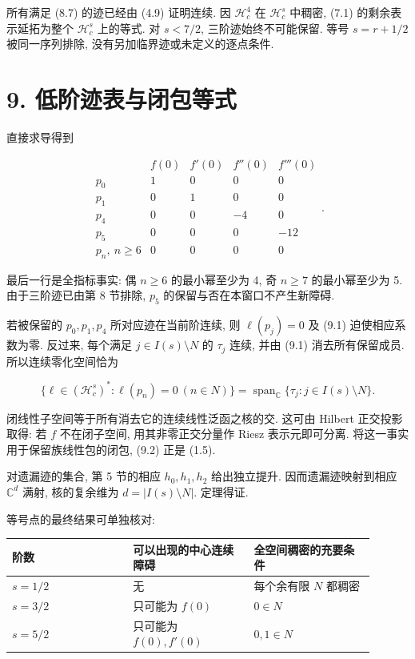 \documentclass[UTF8,fontset=fandol,11pt,a4paper]{ctexart}
\begin{document}
所有满足 (8.7) 的迹已经由 (4.9) 证明连续. 因 \(\mathcal H_c^4\) 在 \(\mathcal H_c^s\) 中稠密, (7.1) 的剩余表示延拓为整个 \(\mathcal H_c^s\) 上的等式. 对 \(s<7/2\), 三阶迹始终不可能保留. 等号 \(s=r+1/2\) 被同一序列排除, 没有另加临界迹或未定义的逐点条件.


\section*{9. 低阶迹表与闭包等式}

直接求导得到


\[
 \begin{array}{c|rrrr}
       &f(0)&f'(0)&f''(0)&f'''(0)\\ \hline
 p_0&1&0&0&0\\
 p_1&0&1&0&0\\
 p_4&0&0&-4&0\\
 p_5&0&0&0&-12\\
 p_n,\ n\ge6&0&0&0&0
 \end{array}.
 \tag{9.1}
\]


最后一行是全指标事实: 偶 \(n\ge6\) 的最小幂至少为 4, 奇 \(n\ge7\) 的最小幂至少为 5. 由于三阶迹已由第 8 节排除, \(p_5\) 的保留与否在本窗口不产生新障碍.


若被保留的 \(p_0,p_1,p_4\) 所对应迹在当前阶连续, 则 \(\ell(p_j)=0\) 及 (9.1) 迫使相应系数为零. 反过来, 每个满足 \(j\in I(s)\setminus N\) 的 \(\tau_j\) 连续, 并由 (9.1) 消去所有保留成员. 所以连续零化空间恰为


\[
 \{\ell\in(\mathcal H_c^s)^*:\ell(p_n)=0\ (n\in N)\}
 =
 \operatorname{span}_{\mathbb C}\{\tau_j:j\in I(s)\setminus N\}.
 \tag{9.2}
\]


闭线性子空间等于所有消去它的连续线性泛函之核的交. 这可由 Hilbert 正交投影取得: 若 \(f\) 不在闭子空间, 用其非零正交分量作 Riesz 表示元即可分离. 将这一事实用于保留族线性包的闭包, (9.2) 正是 (1.5).


对遗漏迹的集合, 第 5 节的相应 \(h_0,h_1,h_2\) 给出独立提升. 因而遗漏迹映射到相应 \(\mathbb C^d\) 满射, 核的复余维为 \(d=|I(s)\setminus N|\). 定理得证.


等号点的最终结果可单独核对:


\begin{longtable}{@{}>{\raggedright\arraybackslash}p{0.3000\linewidth}>{\raggedright\arraybackslash}p{0.3000\linewidth}>{\raggedright\arraybackslash}p{0.3000\linewidth}@{}}
\toprule
阶数 & 可以出现的中心连续障碍 & 全空间稠密的充要条件 \\
\midrule
\(s=1/2\) & 无 & 每个余有限 \(N\) 都稠密 \\
\(s=3/2\) & 只可能为 \(f(0)\) & \(0\in N\) \\
\(s=5/2\) & 只可能为 \(f(0),f'(0)\) & \(0,1\in N\) \\

\bottomrule
\end{longtable}
\end{document}
